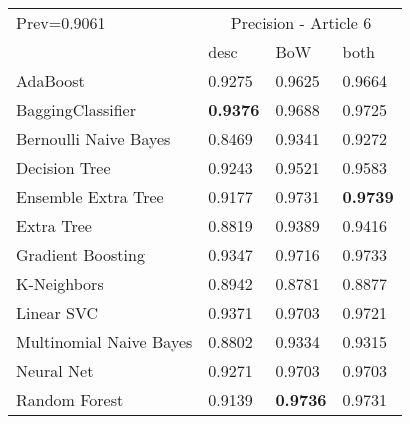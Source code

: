 \begin{tabular}{|l|l|l|l| }
\hline
Prev=0.9061 &  \multicolumn{3}{c|}{Precision - Article 6} \\
\cline{2-4} & desc & BoW & both \\ \hline
AdaBoost                & 0.9275 & 0.9625 & 0.9664\\
BaggingClassifier       & {\bf 0.9376} & 0.9688 & 0.9725\\
Bernoulli Naive Bayes   & 0.8469 & 0.9341 & 0.9272\\
Decision Tree           & 0.9243 & 0.9521 & 0.9583\\
Ensemble Extra Tree     & 0.9177 & 0.9731 & {\bf 0.9739}\\
Extra Tree              & 0.8819 & 0.9389 & 0.9416\\
Gradient Boosting       & 0.9347 & 0.9716 & 0.9733\\
K-Neighbors             & 0.8942 & 0.8781 & 0.8877\\
Linear SVC              & 0.9371 & 0.9703 & 0.9721\\
Multinomial Naive Bayes & 0.8802 & 0.9334 & 0.9315\\
Neural Net              & 0.9271 & 0.9703 & 0.9703\\
Random Forest           & 0.9139 & {\bf 0.9736} & 0.9731\\
\hline
\end{tabular}